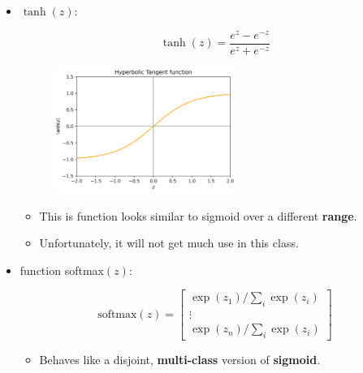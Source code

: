 \begin{itemize}
            \item {} $\tanh(z)$:    
                
                \begin{equation}
                    \tanh(z) = \frac{e^z - e^{-z}}{e^z + e^{-z}}
                \end{equation}
                
                \begin{figure}[H]
                    \centering
                    \includegraphics[width=60mm,scale=0.4]{images/nn_images/tanh_fn.png}
                \end{figure}
                
                \begin{itemize}
                    \item This is function looks similar to sigmoid over a different \textbf{range}.
                    
                    \item Unfortunately, it will not get much use in this class.
                \end{itemize}
                
            \item {} function softmax$(z)$:
                
                \begin{equation}
                    \text{softmax}(z) =
                    \begin{bmatrix}
                        \exp(z_1) / \sum_{i} \exp(z_i) \\
                        \vdots \\
                        \exp(z_n) / \sum_{i} \exp(z_i)
                    \end{bmatrix}
                \end{equation}
                
                \begin{itemize}
                    \item Behaves like a disjoint, \textbf{multi-class} version of \textbf{sigmoid}.
                    

\end{itemize}
\end{itemize}
